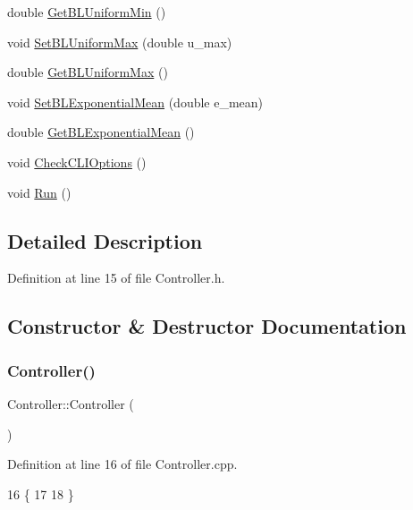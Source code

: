\begin{DoxyCompactItemize}
double \hyperlink{classController_a733dd443633473ab1105c7f9bb88436a}{Get\+B\+L\+Uniform\+Min} ()
\item 
void \hyperlink{classController_ab75b88551fab21ddd99e748e21f6a334}{Set\+B\+L\+Uniform\+Max} (double u\+\_\+max)
\item 
double \hyperlink{classController_a3e8896ea85dbcf96e8995bcc15ab5945}{Get\+B\+L\+Uniform\+Max} ()
\item 
void \hyperlink{classController_ab3192e74f31bbe2e7faf70d497c67e9b}{Set\+B\+L\+Exponential\+Mean} (double e\+\_\+mean)
\item 
double \hyperlink{classController_aa645cd80a92c70d1cbffbc4e97ce27ae}{Get\+B\+L\+Exponential\+Mean} ()
\item 
void \hyperlink{classController_a1307438a1590b0deff238e4ee46aaed3}{Check\+C\+L\+I\+Options} ()
\item 
void \hyperlink{classController_a17abb2cec6c0109e9b2df3cdc082eaad}{Run} ()
\end{DoxyCompactItemize}


\subsection{Detailed Description}


Definition at line 15 of file Controller.\+h.



\subsection{Constructor \& Destructor Documentation}
\mbox{\label{classController_a95c56822d667e94b031451729ce069a9}} 
\subsubsection{\texorpdfstring{Controller()}{Controller()}}
{\footnotesize\ttfamily Controller\+::\+Controller (\begin{DoxyParamCaption}{ }\end{DoxyParamCaption})}



Definition at line 16 of file Controller.\+cpp.


\begin{DoxyCode}
16                       \{
17   
18 \}
\end{DoxyCode}


